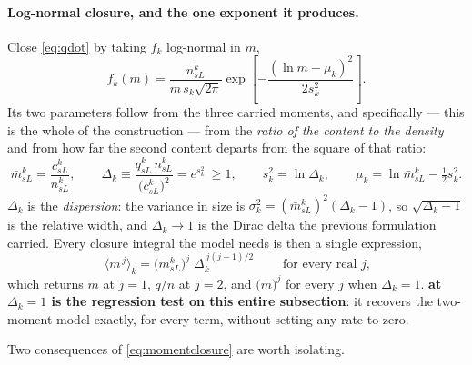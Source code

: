 \documentclass{article}
\begin{document}
\paragraph{Log-normal closure, and the one exponent it produces.} Close
\cref{eq:qdot} by taking $f_k$ log-normal in $m$,
\begin{equation}
  f_k(m)=\frac{n^k_{sL}}{m\,s_k\sqrt{2\pi}}
    \exp\!\left[-\frac{\left(\ln m-\mu_k\right)^2}{2s_k^{2}}\right].
  \label{eq:lognormal}
\end{equation}
Its two parameters follow from the three carried moments, and specifically ---
this is the whole of the construction --- from the \emph{ratio of the content to
the density} and from how far the second content departs from the square of that
ratio:
\begin{equation}
  \bar m^k_{sL}=\frac{c^k_{sL}}{n^k_{sL}},
  \qquad
  \Delta_k\equiv\frac{q^k_{sL}\,n^k_{sL}}{\bigl(c^k_{sL}\bigr)^{2}}
   =e^{s_k^{2}}\ \ge 1,
  \qquad
  s_k^{2}=\ln\Delta_k,
  \qquad
  \mu_k=\ln\bar m^k_{sL}-\tfrac12 s_k^{2}.
  \label{eq:closure}
\end{equation}
$\Delta_k$ is the \emph{dispersion}: the variance in size is
$\sigma_k^2=(\bar m^k_{sL})^2(\Delta_k-1)$, so $\sqrt{\Delta_k-1}$ is the
relative width, and $\Delta_k\to1$ is the Dirac delta the previous formulation
carried. Every closure integral the model needs is then a single expression,
\begin{equation}
  \boxed{\;
  \bigl\langle m^{\,j}\bigr\rangle_k
   =\bigl(\bar m^k_{sL}\bigr)^{j}\;\Delta_k^{\,j(j-1)/2}\;}
  \qquad\text{for every real }j,
  \label{eq:momentclosure}
\end{equation}
which returns $\bar m$ at $j=1$, $q/n$ at $j=2$, and $\bigl(\bar
m\bigr)^{j}$ for every $j$ when $\Delta_k=1$. \textbf{ at
$\Delta_k=1$ is the regression test on this entire subsection}: it recovers the
two-moment model exactly, for every term, without setting any rate to zero.

Two consequences of \cref{eq:momentclosure} are worth isolating.
\end{document}
